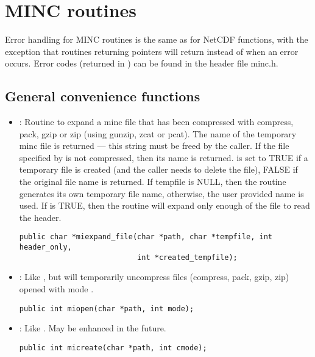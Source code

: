 \documentclass{article}
\begin{document}
\section{MINC routines}

Error handling for MINC routines is the same as for NetCDF functions,
with the exception that routines returning pointers will return
 instead of  when an error occurs. Error
codes (returned in ) can be found in the header file
minc.h.

\subsection{General convenience functions}

\begin{itemize}

\item {} : Routine to expand a minc file that has
been compressed with compress, pack, gzip or zip (using gunzip, zcat
or pcat). The name of the temporary minc file is returned --- this
string must be freed by the caller. If the file specified by
 is not compressed, then its name is returned.
 is set to TRUE if a temporary file is
created (and the caller needs to delete the file), FALSE if the
original file name is returned. If tempfile is NULL, then the routine
generates its own temporary file name, otherwise, the user provided
name is used. If  is TRUE, then the routine will
expand only enough of the file to read the header.
\begin{verbatim}
public char *miexpand_file(char *path, char *tempfile, int header_only, 
                           int *created_tempfile);
\end{verbatim}

\item {} : Like , but will temporarily
uncompress files (compress, pack, gzip, zip) opened with mode 
.
\begin{verbatim}
public int miopen(char *path, int mode);
\end{verbatim}

\item {} : Like . May be enhanced in the future.
\begin{verbatim}
public int micreate(char *path, int cmode);
\end{verbatim}


\end{itemize}
\end{document}
